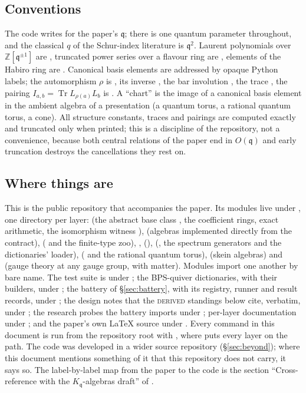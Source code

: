\documentclass[11pt]{amsart}
\DeclareMathOperator{\Tr}{Tr}
\newcommand\fq{\mathfrak{q}}
\newcommand\bZ{\mathbb{Z}}
\theoremstyle{remark}
\newcommand{\DERIVED}{\textsc{derived}}
\begin{document}
\subsection{Conventions}
The code writes  for the paper's $\fq$; there is one quantum
parameter throughout, and the classical $q$ of the Schur-index literature
is $\fq^2$.  Laurent polynomials over $\bZ[\fq^{\pm1}]$ are
, truncated power series over a flavour ring are
, elements of the Habiro ring are .
Canonical basis elements are addressed by opaque Python labels; the
automorphism $\rho$ is , its inverse , the bar
involution , the trace , the pairing
$I_{a,b}=\Tr L_{\rho(a)}L_b$ is .  A ``chart'' is the
image of a canonical basis element in the ambient algebra of a
presentation (a quantum torus, a rational quantum torus, a cone).  All
structure constants, traces and pairings are computed exactly and
truncated only when printed; this is a discipline of the repository, not
a convenience, because both central relations of the paper end in
$O(\fq)$ and early truncation destroys the cancellations they rest on.

\subsection{Where things are}
This is the public repository that accompanies the paper.  Its modules
live under , one directory per layer:  (the
abstract base class , the coefficient rings, exact
arithmetic, the isomorphism witness ), 
(algebras implemented directly from the contract), 
( and the finite-type zoo), ,
 (),  (, the
spectrum generators and the dictionaries' loader), 
( and the rational quantum torus), 
(skein algebras) and  (gauge theory at any gauge group, with
matter).  Modules import one another by bare name.  The test suite is under
; the BPS-quiver dictionaries, with their builders, under
; the battery of \S\ref{sec:battery}, with its registry,
runner and result records, under ; the design notes that the
\DERIVED{} standings below cite, verbatim, under ; the
research probes the battery imports under ; per-layer
documentation under ; and the paper's own \LaTeX{} source under
.  Every command in this document is run
from the repository root with , where
 puts every  layer on the path.  The code
was developed in a wider source repository (\S\ref{sec:beyond}); where this
document mentions something of it that this repository does not carry, it
says so.  The label-by-label map from the paper to the code is the section
``Cross-reference with the $K_\fq$-algebras draft'' of
.
\end{document}

